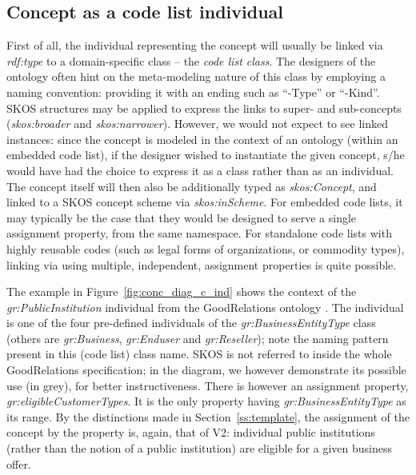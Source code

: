 \subsection{Concept as a code list individual}


First of all, the individual representing the concept will usually be linked via \emph{rdf:type} to a domain-specific class -- the \emph{code list class}.
The designers of the ontology often hint on the meta-modeling nature of this class by employing a naming convention: providing it with an ending such as ``-Type'' or ``-Kind''.
SKOS structures may be applied to express the links to super- and sub-concepts (\emph{skos:broader} and  \emph{skos:narrower}).
However, we would not expect to see linked instances: since the concept is modeled in the context of an ontology (within an embedded code list), if the designer wished to instantiate the given concept, s/he would have had the choice to express it as a class rather than as an individual.
The concept itself will then also be additionally typed as \emph{skos:Concept}, and linked to a SKOS concept scheme via \emph{skos:inScheme}.
For embedded code lists, it may typically be the case that they would be designed to serve a single assignment property, from the same namespace.
For standalone code lists with highly reusable codes (such as legal forms of organizations, or commodity types), linking via using multiple, independent, assignment properties is quite possible.

The example in Figure~\ref{fig:conc_diag_c_ind} shows the context of the \emph{gr:PublicInstitution} individual from the GoodRelations ontology \cite{GR}.
The individual is one of the four pre-defined individuals of the \emph{gr:BusinessEntityType} class (others are \emph{gr:Business}, \emph{gr:Enduser} and \emph{gr:Reseller}); note the naming pattern present in this (code list) class name.
SKOS is not referred to inside the whole GoodRelations specification; in the diagram, we however demonstrate its possible use (in grey), for better instructiveness.
There is however an assignment property, \emph{gr:eligibleCustomerTypes}.
It is the only property having \emph{gr:BusinessEntityType} as its range.
By the distinctions made in Section~\ref{ss:template}, the assignment of the concept by the property is, again, that of V2: individual public institutions (rather than the notion of a public institution) are eligible for a given business offer.


